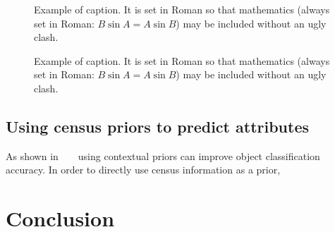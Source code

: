 \documentclass[10pt,twocolumn,letterpaper]{article}
\begin{document}
\begin{figure}[t]
\begin{center}
\fbox{\rule{0pt}{2in} \rule{0.9\linewidth}{0pt}}
\end{center}
   \caption{Example of caption.  It is set in Roman so that mathematics
   (always set in Roman: $B \sin A = A \sin B$) may be included without an
   ugly clash.}
\label{fig:fg-hierarchy}
\end{figure}

\begin{figure}[t]
\begin{center}
\fbox{\rule{0pt}{2in} \rule{0.9\linewidth}{0pt}}
\end{center}
   \caption{Example of caption.  It is set in Roman so that mathematics
   (always set in Roman: $B \sin A = A \sin B$) may be included without an
   ugly clash.}
\label{fig:fg-confusion}
\end{figure}

\subsection{Using census priors to predict attributes}
As shown in ~\cite{birdsnap} ~\cite{Other context stuff} using contextual priors can improve object classification accuracy. In order to directly use census information as a prior,


\section{Conclusion}

{\small


}
\end{document}
